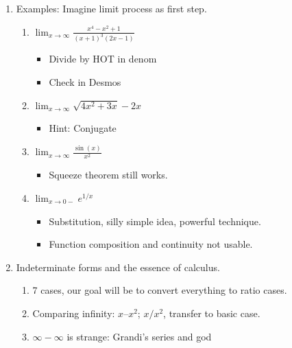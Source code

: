 \documentclass{article}
\newcommand{\ds}{\displaystyle}
\begin{document}
\begin{enumerate}
\item Examples: Imagine limit process as first step.
\begin{enumerate}
\item $\ds \lim_{x \rightarrow \infty} \frac{x^4-x^2+1}{(x+1)^3(2x-1)}$
\begin{itemize}
\item Divide by HOT in denom
\item Check in Desmos
\end{itemize} 
\item $\ds \lim_{x \rightarrow \infty} \sqrt{4x^2 + 3x} - 2x$
\begin{itemize}
\item Hint: Conjugate
\end{itemize}
\item $ \ds \lim_{x \rightarrow \infty} \frac{\sin(x)}{x^2}$
\begin{itemize}
\item Squeeze theorem still works.
\end{itemize}
\item $\ds \lim_{x \rightarrow 0-} e^{1/x}$
\begin{itemize}
\item Substitution, silly simple idea, powerful technique.
\item Function composition and continuity not usable.
\end{itemize}
\end{enumerate}

\item Indeterminate forms and the essence of calculus.
\begin{enumerate}
\item 7 cases, our goal will be to convert everything to ratio cases.
\item Comparing infinity: $x – x^2$; $x/x^2$, transfer to basic case.
\item $\infty - \infty$ is strange: Grandi's series and god
\end{enumerate}

\end{enumerate}


\end{document}
